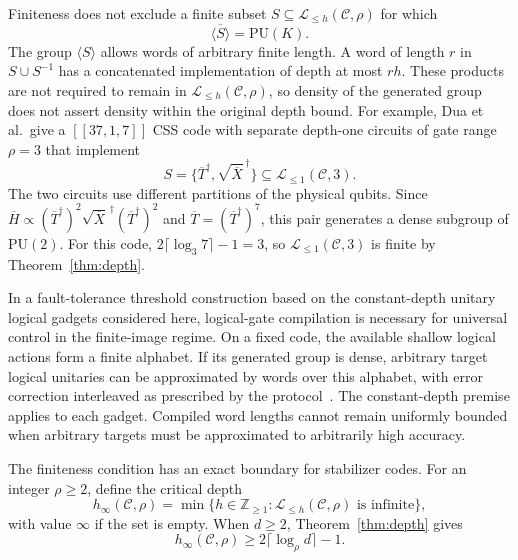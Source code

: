 \documentclass[aps,prl,reprint,notitlepage,nofootinbib,nobibnotes]{revtex4-2}
\newcommand{\PU}{\mathrm{PU}}
\begin{document}
Finiteness does not exclude a finite subset \(S\subseteq\mathcal L_{\le h}(\mathcal C,\rho)\)
for which
\[
 \overline{\langle S\rangle}=\PU(K).
\]
The group \(\langle S\rangle\) allows words of arbitrary finite length.
A word of length \(r\) in \(S\cup S^{-1}\) has a concatenated
implementation of depth at most \(rh\). These products are not required
to remain in \(\mathcal L_{\le h}(\mathcal C,\rho)\), so density of the generated group does not
assert density within the original depth bound.
For example, Dua et al.\ give a \([[37,1,7]]\) CSS code with separate depth-one
circuits of gate range \(\rho=3\) that
implement~\cite[Sec.~V and Appendix~B~3]{Dua}
\[
 S=\bigl\{\overline T^\dagger,
          \sqrt{\overline X}^{\,\dagger}\bigr\}
   \subseteq\mathcal L_{\le1}(\mathcal C,3).
\]
The two circuits use different partitions of the physical qubits.
Since \(\overline H\propto
(\overline T^\dagger)^2\sqrt{\overline X}^{\,\dagger}
(\overline T^\dagger)^2\) and
\(\overline T=(\overline T^\dagger)^7\), this pair generates a dense
subgroup of \(\PU(2)\). For this code,
\(2\lceil\log_3 7\rceil-1=3\), so \(\mathcal L_{\le1}(\mathcal C,3)\) is finite by
Theorem~\ref{thm:depth}.


In a fault-tolerance threshold construction based on the constant-depth
unitary logical gadgets considered here, logical-gate compilation is
necessary for universal control in the finite-image regime. On a fixed
code, the available shallow logical actions form a finite alphabet. If
its generated group is dense, arbitrary target logical unitaries can be
approximated by words over this alphabet, with error correction
interleaved as prescribed by the protocol~\cite{Gottesman,Dua}. The
constant-depth premise applies to each gadget. Compiled word lengths cannot
remain uniformly bounded when arbitrary targets must be approximated to
arbitrarily high accuracy.

The finiteness condition has an exact boundary for stabilizer codes. For an integer \(\rho\ge2\), define the critical depth
\begin{equation}\label{eq:critical-definition}
 h_\infty(\mathcal C,\rho)
  =\min\{h\in\mathbb Z_{\ge1}:\mathcal L_{\le h}(\mathcal C,\rho)
                   \text{ is infinite}\},
\end{equation}
with value \(\infty\) if the set is empty. When \(d\ge2\), Theorem~\ref{thm:depth} gives
\begin{equation}\label{eq:critical-lower}
 h_\infty(\mathcal C,\rho)\ge2\lceil\log_{\rho} d\rceil-1.
\end{equation}
\end{document}
